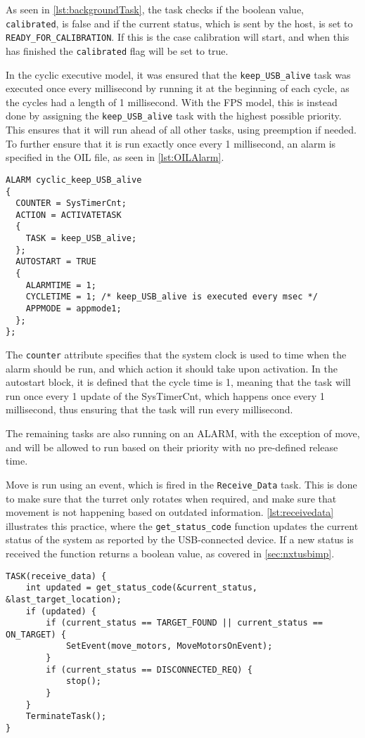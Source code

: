 As seen in \autoref{lst:backgroundTask}, the task checks if the boolean value, \texttt{calibrated}, is false and if the current status, which is sent by the host, is set to \texttt{READY\_FOR\_CALIBRATION}.
If this is the case calibration will start, and when this has finished the \texttt{calibrated} flag will be set to true.

In the cyclic executive model, it was ensured that the \texttt{keep\_USB\_alive} task was executed once every millisecond by running it at the beginning of each cycle, as the cycles had a length of 1 millisecond.
With the FPS model, this is instead done by assigning the \texttt{keep\_USB\_alive} task with the highest possible priority.
This ensures that it will run ahead of all other tasks, using preemption if needed.
To further ensure that it is run exactly once every 1 millisecond, an alarm is specified in the OIL file, as seen in \autoref{lst:OILAlarm}.

\begin{lstlisting}[language=CSharp,label={lst:OILAlarm},caption={Alarm in the OIL}]
ALARM cyclic_keep_USB_alive
{
  COUNTER = SysTimerCnt;
  ACTION = ACTIVATETASK
  {
    TASK = keep_USB_alive;
  };
  AUTOSTART = TRUE
  {
    ALARMTIME = 1;
    CYCLETIME = 1; /* keep_USB_alive is executed every msec */
    APPMODE = appmode1;
  };
};
\end{lstlisting}

The \texttt{counter} attribute specifies that the system clock is used to time when the alarm should be run, and which action it should take upon activation.
In the autostart block, it is defined that the cycle time is 1, meaning that the task will run once every 1 update of the SysTimerCnt, which happens once every 1 millisecond, thus ensuring that the task will run every millisecond.

The remaining tasks are also running on an ALARM, with the exception of move, and will be allowed to run based on their priority with no pre-defined release time.

Move is run using an event, which is fired in the \texttt{Receive\_Data} task.
This is done to make sure that the turret only rotates when required, and make sure that movement is not happening based on outdated information.
\autoref{lst:receivedata} illustrates this practice, where the \texttt{get\_status\_code} function updates the current status of the system as reported by the USB-connected device.
If a new status is received the function returns a boolean value, as covered in \autoref{sec:nxtusbimp}.

\begin{lstlisting}[language=CSharp,label={lst:receivedata},caption={The function handling fetching data}]
TASK(receive_data) {
	int updated = get_status_code(&current_status, &last_target_location);
	if (updated) {
		if (current_status == TARGET_FOUND || current_status == ON_TARGET) {
			SetEvent(move_motors, MoveMotorsOnEvent);
		}
		if (current_status == DISCONNECTED_REQ) {
			stop();
		}
	}
	TerminateTask();
}
\end{lstlisting}
